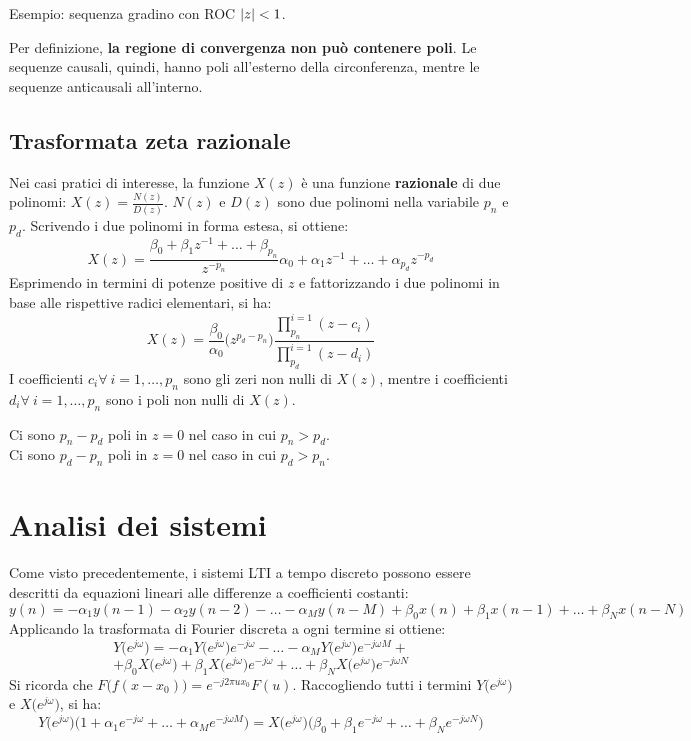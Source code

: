 Esempio: sequenza gradino con ROC $\left|z\right| < 1$.

Per definizione, \textbf{la regione di convergenza non può contenere poli}. Le sequenze causali, quindi, hanno poli all'esterno della circonferenza, mentre le sequenze anticausali all'interno.

\subsection{Trasformata zeta razionale}
Nei casi pratici di interesse, la funzione $X(z)$ è una funzione \textbf{razionale} di due polinomi: $X(z) = \frac{N(z)}{D(z)}$.
$N(z)$ e $D(z)$ sono due polinomi nella variabile $p_n$ e $p_d$. Scrivendo i due polinomi in forma estesa, si ottiene:
$$X(z) = \frac{\beta_0 + \beta_1z^{-1} + \ldots + \beta_{p_n}}{z^{-p_n}}{\alpha_0 + \alpha_1z^{-1} + \ldots + \alpha_{p_d}z^{-p_d}}$$
Esprimendo in termini di potenze positive di $z$ e fattorizzando i due polinomi in base alle rispettive radici elementari, si ha:
$$X(z) = \frac{\beta_0}{\alpha_0}\big(z^{p_d - p_n}\big) \frac{\prod_{p_n}^{i=1}(z-c_i)}{\prod_{p_d}^{i=1}(z-d_i)}$$
I coefficienti $c_i \forall\ i = 1, \dots, p_n$ sono gli zeri non nulli di $X(z)$, mentre i coefficienti $d_i \forall\ i = 1, \dots, p_n$ sono i poli non nulli di $X(z)$.

Ci sono $p_n - p_d$ poli in $z = 0$ nel caso in cui $p_n > p_d$. \\
Ci sono $p_d - p_n$ poli in $z = 0$ nel caso in cui $p_d > p_n$. 

\section{Analisi dei sistemi}
Come visto precedentemente, i sistemi LTI a tempo discreto possono essere descritti da equazioni lineari alle differenze a coefficienti costanti:
$$y(n) = -\alpha_1y(n-1) - \alpha_2y(n - 2) - \ldots - \alpha_My(n - M) + \beta_0x(n) + \beta_1x(n - 1) + \ldots + \beta_Nx(n - N)$$
Applicando la trasformata di Fourier discreta a ogni termine si ottiene:
$$Y\big(e^{j\omega}\big) = -\alpha_1Y\big(e^{j\omega}\big)e^{-j\omega} - \ldots - \alpha_MY\big(e^{j\omega}\big)e^{-j\omega M} + $$
$$ + \beta_0 X\big(e^{j\omega}\big) + \beta_1X\big(e^{j\omega}\big)e^{-j\omega} + \ldots + \beta_NX\big(e^{j\omega}\big)e^{-j\omega N}$$
Si ricorda che $F\big(f(x - x_0)\big) = e^{-j2\pi ux_0} F(u)$. Raccogliendo tutti i termini $Y\big(e^{j\omega}\big)$ e $X\big(e^{j\omega}\big)$, si ha:
$$Y\big(e^{j\omega}\big) \big(1 + \alpha_1e^{-j\omega} + \ldots + \alpha_Me^{-j\omega M}\big) = X\big(e^{j\omega}\big) \big(\beta_0 + \beta_1e^{-j\omega} + \ldots + \beta_Ne^{-j\omega N}\big)$$

